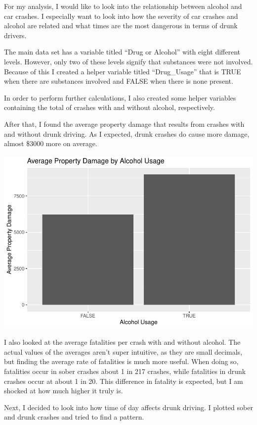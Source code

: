 \documentclass[conference,final,]{IEEEtran}
\begin{document}
For my analysis, I would like to look into the relationship between alcohol and car crashes. I especially want to look into how the severity of car crashes and alcohol are related and what times are the most dangerous in terms of drunk drivers.

The main data set has a variable titled ``Drug or Alcohol'' with eight different levels. However, only two of these levels signify that substances were not involved. Because of this I created a helper variable titled ``Drug\_Usage'' that is TRUE when there are substances involved and FALSE when there is none present.

In order to perform further calculations, I also created some helper variables containing the total of crashes with and without alcohol, respectively.

After that, I found the average property damage that results from crashes with and without drunk driving. As I expected, drunk crashes do cause more damage, almost \$3000 more on average.

\begin{center}\includegraphics[width=0.9\columnwidth]{CAUSE_files/figure-latex/unnamed-chunk-9-1} \end{center}

I also looked at the average fatalities per crash with and without alcohol. The actual values of the averages aren't super intuitive, as they are small decimals, but finding the average rate of fatalities is much more useful. When doing so, fatalities occur in sober crashes about 1 in 217 crashes, while fatalities in drunk crashes occur at about 1 in 20. This difference in fatality is expected, but I am shocked at how much higher it truly is.

Next, I decided to look into how time of day affects drunk driving. I plotted sober and drunk crashes and tried to find a pattern.
\end{document}

